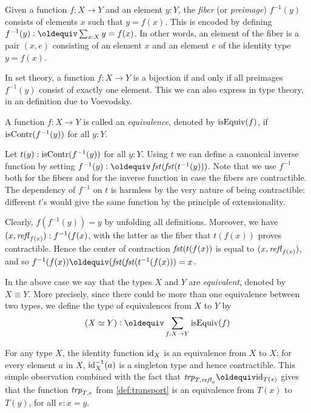 \begin{definition}
\label{def:fiber}
Given a function $f : X \to Y$ and an element $y:Y$, 
the \emph{fiber} (or \emph{preimage}) $f^{-1}(y)$ consists 
of elements $x$ such that $y = f(x)$.  
This is encoded by defining $f^{-1}(y) \defeq \sum_{x:X} y = f(x)$.  
In other words, an element of the fiber is a pair $(x,e)$ consisting
of an element $x$ and an element $e$ of the identity type $y = f(x)$.
\end{definition}

In set theory, a function $f : X \to Y$ is a bijection if and only if
all preimages $f^{-1}(y)$ consist of exactly one element.
This we can also express in type theory, in an definition due
to Voevodsky. 

\begin{definition}
\label{def:equivalence}
A function $f : X \to Y$ is called an \emph{equivalence},
denoted by $\mathrm{isEquiv}(f)$, if $\mathrm{isContr}(f^{-1}(y))$ for all $y:Y$.
\end{definition}

Let $t(y): \mathrm{isContr}(f^{-1}(y))$ for all $y:Y$.
Using $t$ we can define a canonical inverse function
by setting $f^{-1}(y)\defeq\fst(\fst(t^{-1}(y)))$.
Note that we use $f^{-1}$ both for the fibers and
for the inverse function in case the fibers are contractible.
The dependency of $f^{-1}$ on $t$ is harmless by the very nature of
being contractible: different $t$'s would give the same
function by the principle of extensionality.

Clearly, $f(f^{-1}(y)) = y$ by unfolding all definitions.
Moreover, we have $(x,\mathop{{\it refl}_{f(x)}}) : f^{-1}(f(x)$,
with the latter as the fiber that $t(f(x))$
proves contractible. Hence the center of contraction
$\mathop{\mathit{fst}}(t(f(x))$ is equal to $(x,\mathop{{\it refl}_{f(x)}})$, and so
$f^{-1}(f(x))\jdeq(\fst(\fst(t^{-1}(f(x))) = x$.

In the above case we say that the types
$X$ and $Y$ are \emph{equivalent}, denoted by $X\equiv Y$. 
More precisely, since there could be more than one equivalence
between two types, we define the type of equivalences from $X$ to $Y$ by
\[
(X\equiv Y) \defeq \sum_{f:X\to Y} \isEq(f) 
\]

For any type $X$, the identity function $\mathord{\mathrm{id}}_X$ is an
equivalence from $X$ to $X$: for every element $a$ in $X$,
$\mathord{\mathrm{id}}_X^{-1}(a)$ is a singleton type and hence contractible.
This simple observation combined with the fact that
$\trp_{T,\refl{x}}\jdeq \id_{T(x)}$ gives that
the function $\mathord{\mathit{trp}}_{T,e}$ from \cref{def:transport}
is an equivalence from $T(x)$ to $T(y)$, for all $e: x=y$.

